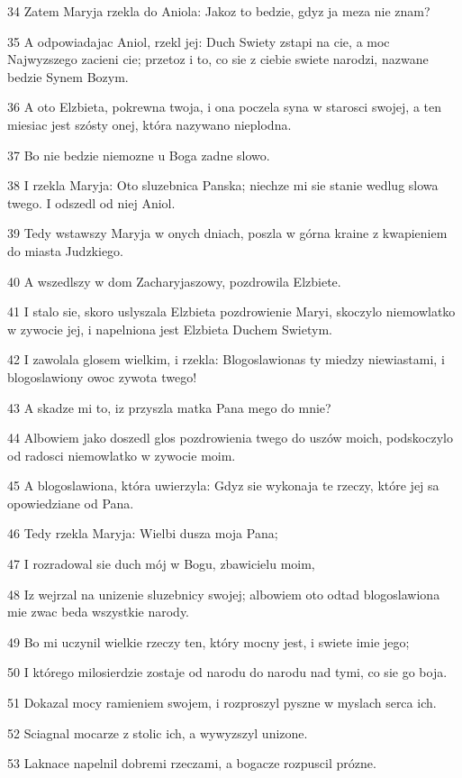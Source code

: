 \par 34 Zatem Maryja rzekla do Aniola: Jakoz to bedzie, gdyz ja meza nie znam?
\par 35 A odpowiadajac Aniol, rzekl jej: Duch Swiety zstapi na cie, a moc Najwyzszego zacieni cie; przetoz i to, co sie z ciebie swiete narodzi, nazwane bedzie Synem Bozym.
\par 36 A oto Elzbieta, pokrewna twoja, i ona poczela syna w starosci swojej, a ten miesiac jest szósty onej, która nazywano nieplodna.
\par 37 Bo nie bedzie niemozne u Boga zadne slowo.
\par 38 I rzekla Maryja: Oto sluzebnica Panska; niechze mi sie stanie wedlug slowa twego. I odszedl od niej Aniol.
\par 39 Tedy wstawszy Maryja w onych dniach, poszla w górna kraine z kwapieniem do miasta Judzkiego.
\par 40 A wszedlszy w dom Zacharyjaszowy, pozdrowila Elzbiete.
\par 41 I stalo sie, skoro uslyszala Elzbieta pozdrowienie Maryi, skoczylo niemowlatko w zywocie jej, i napelniona jest Elzbieta Duchem Swietym.
\par 42 I zawolala glosem wielkim, i rzekla: Blogoslawionas ty miedzy niewiastami, i blogoslawiony owoc zywota twego!
\par 43 A skadze mi to, iz przyszla matka Pana mego do mnie?
\par 44 Albowiem jako doszedl glos pozdrowienia twego do uszów moich, podskoczylo od radosci niemowlatko w zywocie moim.
\par 45 A blogoslawiona, która uwierzyla: Gdyz sie wykonaja te rzeczy, które jej sa opowiedziane od Pana.
\par 46 Tedy rzekla Maryja: Wielbi dusza moja Pana;
\par 47 I rozradowal sie duch mój w Bogu, zbawicielu moim,
\par 48 Iz wejrzal na unizenie sluzebnicy swojej; albowiem oto odtad blogoslawiona mie zwac beda wszystkie narody.
\par 49 Bo mi uczynil wielkie rzeczy ten, który mocny jest, i swiete imie jego;
\par 50 I którego milosierdzie zostaje od narodu do narodu nad tymi, co sie go boja.
\par 51 Dokazal mocy ramieniem swojem, i rozproszyl pyszne w myslach serca ich.
\par 52 Sciagnal mocarze z stolic ich, a wywyzszyl unizone.
\par 53 Laknace napelnil dobremi rzeczami, a bogacze rozpuscil prózne.
